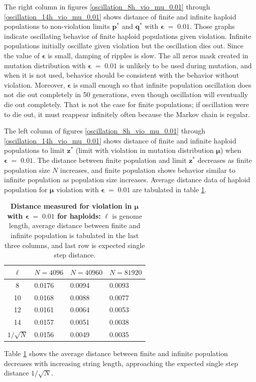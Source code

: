 The right column in figures \ref{oscillation_8h_vio_mu_0.01} through \ref{oscillation_14h_vio_mu_0.01} 
shows distance of finite and infinite haploid populations to non-violation limits $\bm{p^\ast}$ and $\bm{q^\ast}$ with $\bm{\epsilon} \;=\; 0.01$. 
Those graphs indicate oscillating behavior of finite haploid populations given violation. 
Infinite populations initially oscillate given violation but the oscillation dies out. Since the value of $\bm{\epsilon}$ 
is small, damping of ripples is slow. The all zeros mask created in mutation distribution with $\bm{\epsilon} \;=\; 0.01$ 
is unlikely to be used during mutation, and when it is not used, behavior should be consistent with the 
behavior without violation. Moreover, $\bm{\epsilon}$ is small enough so that 
infinite population oscillation does not die out completely in 50 generations, 
even though oscillation will eventually die out completely. 
That is not the case for finite populations; if oscillation were to die out, 
it must reappear infinitely often because the Markov chain is regular.

The left column of figures \ref{oscillation_8h_vio_mu_0.01} through \ref{oscillation_14h_vio_mu_0.01} 
shows distance of finite and infinite haploid populations to limit $\bm{z^\ast}$ 
(limit with violation in mutation distribution $\bm{\mu}$) when $\bm{\epsilon} \;=\; 0.01$. 
The distance between finite population and limit $\bm{z}^\ast$ 
decreases as finite population size $N$ increases, 
and finite population shows behavior similar to infinite population as population size increases. 
Average distance data of haploid population for $\bm{\mu}$ violation  
with $\bm{\epsilon} \;=\; 0.01$ are tabulated in table \ref{distanceMuHapEps0.01}.

\clearpage
\begin{table}[h]
\caption[\textbf{Distance measured for violation in $\bm{\mu}$ with $\bm{\epsilon} \;=\; 0.01$ for haploids}]
{\textbf{Distance measured for violation in $\bm{\mu}$ with $\bm{\epsilon} \;=\; 0.01$ for haploids:} $\ell$ is genome length, 
average distance between finite and infinite population is tabulated in the last three columns, and last row is expected single step distance.}
\centering
\begin{tabularx}{0.75\textwidth}{ c *{3}{X}}
\toprule
$\ell$ & $N = 4096$ & $N = 40960$ & $N = 81920$ \\
\midrule
8 & 0.0176	& 0.0094	& 0.0093 \\
10 & 0.0168	& 0.0088 	& 0.0077 \\ 
12 & 0.0161	& 0.0064 	& 0.0053 \\
14 & 0.0157	& 0.0051 	& 0.0038 \\ 
\midrule
$1/\sqrt{N}$ & 0.0156 & 0.0049 & 0.0035 \\
\bottomrule
\end{tabularx}
\label{distanceMuHapEps0.01}
\end{table}
Table \ref{distanceMuHapEps0.01} shows the average distance between finite and infinite population decreases with 
increasing string length, approaching the expected single step distance $1/\sqrt{N}$.

